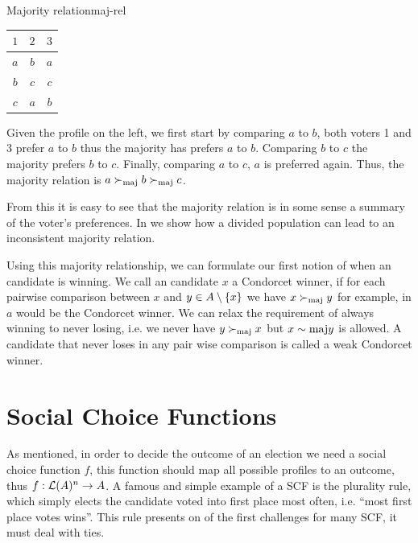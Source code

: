 \begin{example}{Majority relation}{maj-rel}
	\begin{minipage}{0.15\linewidth}
		\begin{tabular}{ccc}
			\toprule
			$1$ & $2$ & $3$ \\
			\midrule
			$a$ & $b$ & $a$ \\
			$b$ & $c$ & $c$ \\
			$c$ & $a$ & $b$ \\
			\bottomrule
		\end{tabular}
	\end{minipage}
	\hspace{0.02\linewidth}
	\begin{minipage}{0.78\linewidth}
		Given the profile on the left, we
		first start by comparing $a$ to $b$, both voters 1 and 3 prefer
		$a$ to $b$ thus the majority has prefers $a$ to $b$. Comparing
		$b$ to $c$ the majority prefers $b$ to $c$. Finally, comparing
		$a$ to $c$, $a$ is preferred again. Thus, the majority relation
		is $a \succ_{\textnormal{maj}} b \succ_{\textnormal{maj}} c$.
	\end{minipage}
\end{example}

From this it is easy to see that the majority relation is in some sense a
summary of the voter's preferences. In 
we show how a divided population can lead to an inconsistent majority relation.

Using this majority relationship, we can formulate our first notion of when an
candidate is winning. We call an candidate $x$ a Condorcet winner, if for
each pairwise comparison between $x$ and $y \in A\setminus
	\{x\}$ we have $x \succ_{\textnormal{maj}} y$ for example, in  $a$ would be
the Condorcet winner. We can relax the requirement of always winning to never
losing, i.e. we never have $y \succ_{\textnormal{maj}} x$ but $x \sim{\textnormal{maj}} y$ is allowed. A
candidate that never loses in any pair wise comparison is called a weak
Condorcet winner.

\section{Social Choice Functions} \label{sec:SCF}

As mentioned, in order to decide the outcome of an election we need a social
choice function $f$, this function should map all possible profiles to an
outcome, thus $f: \mathcal{L}(A)^n \to A$. A famous and
simple example of a SCF is the plurality rule, which simply elects the
candidate voted into first place most often, i.e. ``most first place votes
wins''. This rule presents on of the first challenges for many SCF, it must deal with ties.

